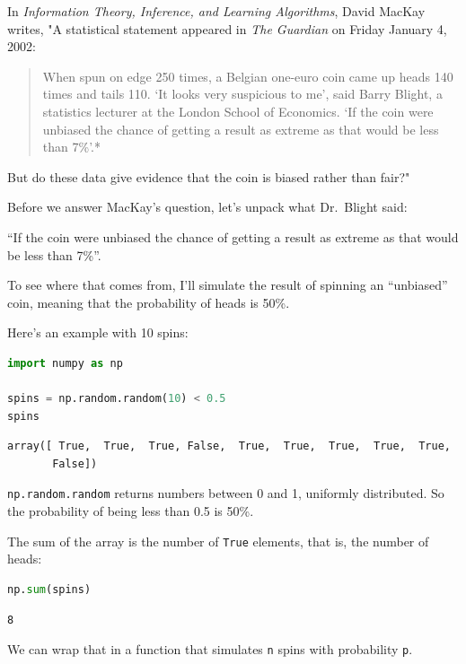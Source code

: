 In \emph{Information Theory, Inference, and Learning Algorithms}, David
MacKay writes, "A statistical statement appeared in \emph{The Guardian}
on Friday January 4, 2002:

\begin{quote}
When spun on edge 250 times, a Belgian one-euro coin came up heads 140
times and tails 110. `It looks very suspicious to me', said Barry
Blight, a statistics lecturer at the London School of Economics. `If the
coin were unbiased the chance of getting a result as extreme as that
would be less than 7\%'.*
\end{quote}

But do these data give evidence that the coin is biased rather than
fair?"

Before we answer MacKay's question, let's unpack what Dr.~Blight said:

``If the coin were unbiased the chance of getting a result as extreme as
that would be less than 7\%''.

To see where that comes from, I'll simulate the result of spinning an
``unbiased'' coin, meaning that the probability of heads is 50\%.

Here's an example with 10 spins:

\begin{lstlisting}[language=Python]
import numpy as np

spins = np.random.random(10) < 0.5
spins
\end{lstlisting}

\begin{lstlisting}[]
array([ True,  True,  True, False,  True,  True,  True,  True,  True,
       False])
\end{lstlisting}

\passthrough{\lstinline!np.random.random!} returns numbers between 0 and
1, uniformly distributed. So the probability of being less than 0.5 is
50\%.

The sum of the array is the number of \passthrough{\lstinline!True!}
elements, that is, the number of heads:

\begin{lstlisting}[language=Python]
np.sum(spins)
\end{lstlisting}

\begin{lstlisting}[]
8
\end{lstlisting}

We can wrap that in a function that simulates
\passthrough{\lstinline!n!} spins with probability
\passthrough{\lstinline!p!}.

